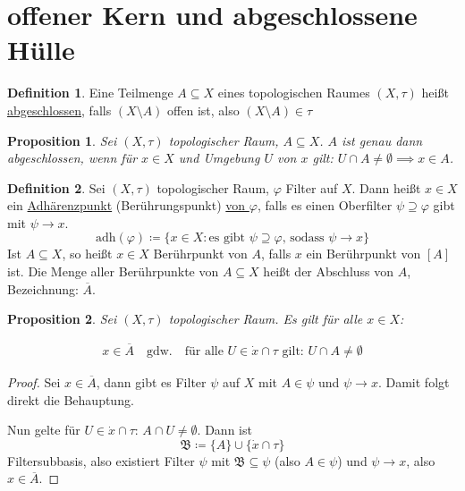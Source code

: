 \documentclass[12pt]{scrartcl}%
\newtheorem{prop}{Proposition}
\theoremstyle{definition}
\newtheorem*{defn}{Definition}
\theoremstyle{remark}
\newcommand{\adh}{\text{adh}}
\begin{document}
\section*{offener Kern und abgeschlossene Hülle}

\begin{defn}
    Eine Teilmenge $A\subseteq X$ eines topologischen Raumes $(X,\tau)$ heißt \underline{abgeschlossen}, falls $(X\setminus A)$ offen ist, also $(X\setminus A)\in\tau$
\end{defn}

\begin{prop}
    Sei $(X,\tau)$ topologischer Raum, $A\subseteq X$. $A$ ist genau dann abgeschlossen, wenn für $x\in X$ und Umgebung $U$ von $x$ gilt: $U\cap A \neq \emptyset \implies x\in A$.
\end{prop}

\begin{defn}
    Sei $(X,\tau)$ topologischer Raum, $\varphi$ Filter auf $X$. Dann heißt $x\in X$ ein \underline{Adhärenzpunkt} (Berührungspunkt) \underline{von $\varphi$}, falls es einen Oberfilter $\psi \supseteq \varphi$ gibt mit $\psi \to x$. $$\adh(\varphi) \coloneqq \{ x\in X: \text{es gibt } \psi \supseteq \varphi \text{, sodass } \psi\to x \}$$ Ist $A\subseteq X$, so heißt $x\in X$ Berührpunkt von $A$, falls $x$ ein Berührpunkt von $[A]$ ist. \newline Die Menge aller Berührpunkte von $A\subseteq X$ heißt der Abschluss von $A$, Bezeichnung: $\overline{A}$.
\end{defn}

\begin{prop}
    Sei $(X,\tau)$ topologischer Raum. Es gilt für alle $x\in X$:

    \begin{gather*}
        x\in \overline{A} \quad \text{gdw.} \quad \text{für alle } U\in \dot x \cap \tau \text{ gilt: } U\cap A \neq \emptyset
    \end{gather*}
\end{prop}

\begin{proof}
    Sei $x\in \overline{A}$, dann gibt es Filter $\psi$ auf $X$ mit $A\in \psi$ und $\psi \to x$. Damit folgt direkt die Behauptung.

    Nun gelte für $U\in \dot x \cap \tau$: $A\cap U \neq \emptyset$. Dann ist $$\mathfrak{B} \coloneqq \{A\} \cup \{\dot x \cap \tau \}$$ Filtersubbasis, also existiert Filter $\psi$ mit $\mathfrak{B} \subseteq \psi$ (also $A\in \psi$) und $\psi \to x$, also $x\in \overline{A}$.
\end{proof}
\end{document}
